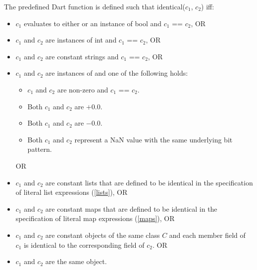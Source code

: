 \documentclass{article}
\newcommand{\code}[1]{{\sf #1}}
\begin{document}
\LMHash{}
The predefined Dart function  is defined such that \code{identical($c_1$, $c_2$)} iff:
 \begin{itemize}
 \item $c_1$  evaluates to either \NULL{} or  an instance of \code{bool} and \code{$c_1$ == $c_2$}, OR
 \item $c_1$ and $c_2$ are instances of \code{int} and \code{$c_1$ == $c_2$}, OR
 \item $c_1$ and $c_2$ are constant strings and \code{$c_1$ == $c_2$}, OR
 \item $c_1$  and $c_2$  are instances of  and  one of the following holds:
 \begin{itemize}
   \item $c_1$ and $c_2$ are non-zero and \code{$c_1$ == $c_2$}.
   \item  Both $c_1$ and $c_2$ are $+0.0$.
   \item Both  $c_1$ and $c_2$ are $-0.0$.
   \item Both $c_1$ and $c_2$ represent a NaN value with the same underlying bit pattern.
 \end{itemize}
 OR
 \item $c_1$ and $c_2$ are constant lists that are defined to be identical in the specification of literal list expressions (\ref{lists}), OR
 \item $c_1$ and $c_2$ are constant maps that are defined to be identical in the specification of literal map expressions (\ref{maps}), OR
 \item $c_1$ and $c_2$ are constant objects of the same class $C$ and each member field of $c_1$ is identical to the corresponding field of $c_2$. OR
\item $c_1$ and $c_2$ are the same object.
\end{itemize}


\end{document}
